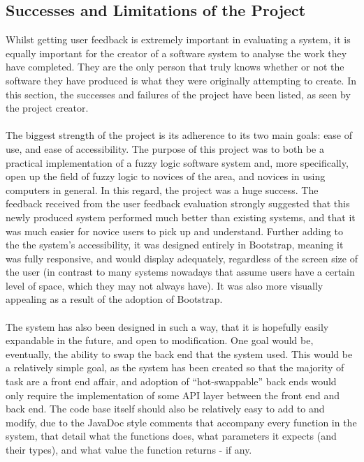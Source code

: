 \subsection{Successes and Limitations of the Project}
Whilst getting user feedback is extremely important in evaluating a system, it is equally important for the creator of a software system to analyse the work they have completed. They are the only person that truly knows whether or not the software they have produced is what they were originally attempting to create. In this section, the successes and failures of the project have been listed, as seen by the project creator.\ \\
\ \\
The biggest strength of the project is its adherence to its two main goals: ease of use, and ease of accessibility. The purpose of this project was to both be a practical implementation of a fuzzy logic software system and, more specifically, open up the field of fuzzy logic to novices of the area, and novices in using computers in general. In this regard, the project was a huge success. The feedback received from the user feedback evaluation strongly suggested that this newly produced system performed much better than existing systems, and that it was much easier for novice users to pick up and understand. Further adding to the the system's accessibility, it was designed entirely in Bootstrap, meaning it was fully responsive, and would display adequately, regardless of the screen size of the user (in contrast to many systems nowadays that assume users have a certain level of space, which they may not always have). It was also more visually appealing as a result of the adoption of Bootstrap.\ \\
\ \\
The system has also been designed in such a way, that it is hopefully easily expandable in the future, and open to modification. One goal would be, eventually, the ability to swap the back end that the system used. This would be a relatively simple goal, as the system has been created so that the majority of task are a front end affair, and adoption of ``hot-swappable'' back ends would only require the implementation of some API layer between the front end and back end. The code base itself should also be relatively easy to add to and modify, due to the JavaDoc style comments that accompany every function in the system, that detail what the functions does, what parameters it expects (and their types), and what value the function returns - if any.
\newpage 
\noindent 
